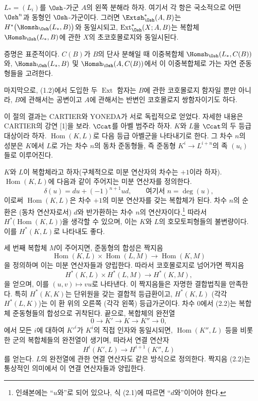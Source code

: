  $L_{*}=(L_i)$를
$\Osh$-가군 $A$의 왼쪽 분해라 하자. 여기서 각 항은 국소적으로 어떤
$\Osh^{n}$과 동형인 $\Osh$-가군이다. 그러면 $\Extsh_{\Osh}^{*}(A,B)$는
$H^{*}\bigl(\Homsh_{\Osh}(L_{*},B)\bigr)$와 동일시되고,
$\operatorname{Ext}_{\Osh}^{*}(X;A,B)$는 복합체
$\Homsh_{\Osh}(L_{*},B)$에 관한 $X$의 초코호몰로지와 동일시된다.

증명은 표준적이다. $C(B)$가 $B$의 단사 분해일 때 이중복합체
$\Homsh_{\Osh}(L_{*},C(B))$와, $\Homsh_{\Osh}(L_{*},B)$ 및
$\Homsh_{\Osh}(A,C(B))$에서 이 이중복합체로 가는 자연
준동형들을 고려한다.

마지막으로, (1.2)에서 도입한 두 $\operatorname{Ext}$ 함자는 $B$에 관한
코호몰로지 함자일 뿐만 아니라, $B$에 관해서는 공변이고 $A$에
관해서는 반변인 코호몰로지 쌍함자이기도 하다.


이 절의 결과는 CARTIER와 YONEDA가 서로 독립적으로 얻었다. 자세한
내용은 CARTIER의 강연 [1]을 보라. $\Ccat$를 아벨 범주라 하자.
$K$와 $L$을 $\Ccat$의 두 등급 대상이라 하자.
$\operatorname{Hom}(K,L)$로 다음 등급 아벨군을 나타내기로 한다. 그 차수
$n$의 성분은 $K$에서 $L$로 가는 차수 $n$의 동차 준동형들, 즉
준동형 $K^{i}\longrightarrow L^{i+n}$의 족 $(u_i)$들로 이루어진다.

$K$와 $L$이 복합체라고 하자(구체적으로 미분 연산자의 차수는 $+1$이라
하자). $\operatorname{Hom}(K,L)$에 다음과 같이 주어지는 미분
연산자를 정의한다.
\begin{equation}\tag{2.1}
  \delta(u)=du+(-1)^{n+1}ud,\qquad\text{여기서 }n=\deg(u),
\end{equation}
이로써 $\operatorname{Hom}(K,L)$은 차수 $+1$의 미분 연산자를 갖는
복합체가 된다. 차수 $n$의 순환은 (동차 연산자로서) $d$와 반가환하는
차수 $n$의 연산자이다.\footnote{인쇄본에는 “$u$와”로 되어 있으나, 식
(2.1)에 따르면 “$d$와”이어야 한다.} 따라서
$H^{*}\bigl(\operatorname{Hom}(K,L)\bigr)$을 생각할 수 있으며, 이는
$K$와 $L$의 호모토피형들의 불변량이다. 이를 $H^{*}(K,L)$로 나타내도 좋다.

세 번째 복합체 $M$이 주어지면, 준동형의 합성은 짝지음
\[
  \operatorname{Hom}(K,L)\times\operatorname{Hom}(L,M)
  \longrightarrow\operatorname{Hom}(K,M)
\]
을 정의하며 이는 미분 연산자들과 양립한다. 따라서 코호몰로지로
넘어가면 짝지음
\begin{equation}\tag{2.2}
  H^{*}(K,L)\times H^{*}(L,M)\longrightarrow H^{*}(K,M),
\end{equation}
을 얻으며, 이를 $(u,v)\longmapsto vu$로 나타낸다. 이 짝지음들은 자명한
결합법칙을 만족한다. 특히 $H^{*}(K,K)$는 단위원을 갖는 결합적
등급환이고, $H^{*}(K,L)$ (각각 $H^{*}(L,K)$)는 이 환 위의 오른쪽
(각각 왼쪽) 등급가군이다. 차수 $0$에서 (2.2)는 복합체 준동형들의
합성으로 귀착된다. 끝으로, 복합체의 완전열
\[
  0\longrightarrow K'\longrightarrow K\longrightarrow K''\longrightarrow 0,
\]
에서 모든 $i$에 대하여 $K'^{i}$가 $K^{i}$의 직접 인자와 동일시되면,
$\operatorname{Hom}(K'',L)$ 등을 비롯한 군의 복합체들의 완전열이
생기며, 따라서 연결 연산자
\[
  H^{i}(K',L)\longrightarrow H^{i+1}(K'',L)
\]
를 얻는다. $L$의 완전열에 관한 연결 연산자도 같은 방식으로 정의한다.
짝지음 (2.2)는 통상적인 의미에서 이 연결 연산자들과 양립한다.

